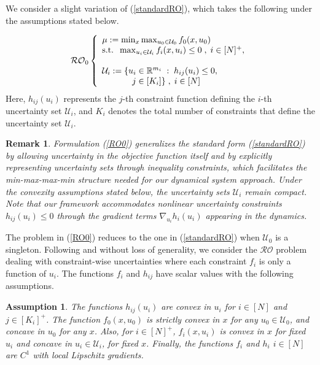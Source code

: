 \documentclass[journal,twoside,web]{ieeecolor}
\newcommand{\rev}[1]{#1}
\newtheorem{assumption}[theorem]{Assumption}
\newtheorem{remark}{Remark}
\begin{document}
We consider a slight variation of (\ref{standardRO}), which takes the following under the assumptions stated below.

\begin{equation}\label{RO0}
\mathcal{RO}_0\left\{ \begin{array}{l}
\mu:=\min_{x} \max_{u_0\in \mathcal{U}_0} f_0(x,u_0)\\
\text{s.t.}\;\;\max_{u_i\in \mathcal{U}_i} f_i(x,u_i)\leq 0\;,\;i\in[N]^+,\\ \\
\mathcal{U}_i:=\{u_i\in \mathbb{R}^{m_i}\;:\;h_{ij}(u_i)\leq 0,\\
\hspace{3.5em} j\in[K_i]\}\;,\;i\in[N]
\end{array}\right.
\end{equation}
\rev{Here, $h_{ij}(u_i)$ represents the $j$-th constraint function defining the $i$-th uncertainty set $\mathcal{U}_i$, and $K_i$ denotes the total number of constraints that define the uncertainty set $\mathcal{U}_i$.} 

\begin{remark} \rev{Formulation (\ref{RO0}) generalizes the standard form (\ref{standardRO}) by allowing uncertainty in the objective function itself and by explicitly representing uncertainty sets through inequality constraints, which facilitates the min-max-max-min structure needed for our dynamical system approach. Under the convexity assumptions stated below, the uncertainty sets $\mathcal{U}_i$ remain compact. Note that our framework accommodates nonlinear uncertainty constraints $h_{ij}(u_i) \leq 0$ through the gradient terms $\nabla_{u_i} h_i(u_i)$ appearing in the dynamics.}
\end{remark}

The problem in (\ref{RO0}) reduces to the one in (\ref{standardRO}) when $\mathcal{U}_0$ is a singleton.
Following \cite{bental2009-2} and without loss of generality, we consider the $\mathcal{RO}$ problem dealing with constraint-wise uncertainties where each constraint $f_i$ is only a function of $u_i$.
The functions $f_i$ and $h_{ij}$ have scalar values with the following assumptions.

\begin{assumption}\label{assume1} The functions $h_{ij}(u_i)$ are convex in $u_i$ for $i\in[N]$ and $j\in[K_i]^+$.
The function $f_0(x,u_0)$ is strictly convex in $x$ for any $u_0\in \mathcal{U}_0$, and concave in $u_0$ for any $x$. Also, for $i\in[N]^+$, $f_i(x,u_i)$ is convex in $x$ for fixed $u_i$ and concave in $u_i\in \mathcal{U}_i$, for fixed $x$.
Finally, the functions $f_i$ and $h_i$ $i\in[N]$ are $C^1$ with local Lipschitz gradients.
\end{assumption}
\end{document}
